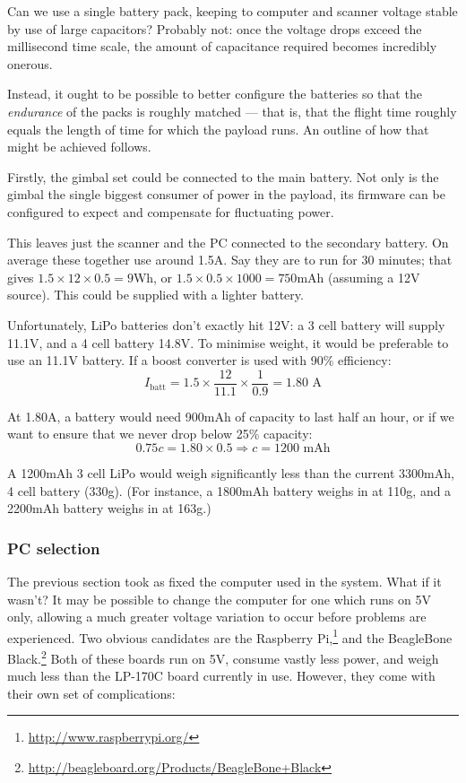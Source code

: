 \documentclass[12pt,oneside,a4paper]{book}
\begin{document}
Can we use a single battery pack, keeping to computer and scanner
voltage stable by use of large capacitors? Probably not: once the
voltage drops exceed the millisecond time scale, the amount of
capacitance required becomes incredibly onerous.

Instead, it ought to be possible to better configure the batteries so
that the \emph{endurance} of the packs is roughly matched --- that is,
that the flight time roughly equals the length of time for which the
payload runs. An outline of how that might be achieved follows.

Firstly, the gimbal set could be connected to the main battery. Not
only is the gimbal the single biggest consumer of power in the
payload, its firmware can be configured to expect and compensate for
fluctuating power.

This leaves just the scanner and the PC connected to the secondary
battery. On average these together use around 1.5A.  Say they are to
run for 30 minutes; that gives $1.5 \times 12 \times 0.5 = 9$Wh, or
$1.5 \times 0.5 \times 1000 = 750$mAh (assuming a 12V source). This
could be supplied with a lighter battery.

Unfortunately, LiPo batteries don't exactly hit 12V: a 3 cell battery
will supply 11.1V, and a 4 cell battery 14.8V. To minimise weight, it
would be preferable to use an 11.1V battery. If a boost converter is
used with 90\% efficiency:
\begin{equation}
  \label{eq:2}
  I_{\text{batt}} = 1.5 \times \frac{12}{11.1} \times \frac{1}{0.9} =
  1.80 \text{ A}
\end{equation}

At 1.80A, a battery would need 900mAh of capacity to last half an
hour, or if we want to ensure that we never drop below 25\% capacity:
\begin{equation}
  \label{eq:3}
  0.75c = 1.80 \times 0.5 \Rightarrow c = 1200 \text{ mAh}
\end{equation}

A 1200mAh 3 cell LiPo would weigh significantly less than the current
3300mAh, 4 cell battery (330g). (For instance, a 1800mAh battery weighs
in at 110g, and a 2200mAh battery weighs in at 163g.)

\subsubsection{PC selection}
\label{sec:electr-gener}

The previous section took as fixed the computer used in the
system. What if it wasn't? It may be possible to change the computer
for one which runs on 5V only, allowing a much greater voltage
variation to occur before problems are experienced. Two obvious
candidates are the Raspberry
Pi,\footnote{\url{http://www.raspberrypi.org/}} and the BeagleBone
Black.\footnote{\url{http://beagleboard.org/Products/BeagleBone+Black}}
Both of these boards run on 5V, consume vastly less power, and weigh
much less than the LP-170C board currently in use. However, they come
with their own set of complications:
\end{document}
